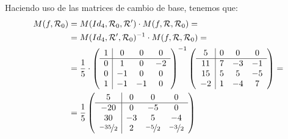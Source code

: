 \documentclass[12pt]{article}
\begin{document}
\begin{ejercicio}[4 puntos]
\begin{enumerate}
            Haciendo uso de las matrices de cambio de base, tenemos que:
            \begin{align*}
                M(f, \mathcal{R}_0) &= M(Id_4, \mathcal{R}_0, \mathcal{R}') \cdot M(f, \mathcal{R}, \mathcal{R}_0) = \\
               &= M(Id_4, \mathcal{R}', \mathcal{R}_0)^{-1} \cdot M(f, \mathcal{R}, \mathcal{R}_0) = \\
                &=  \frac{1}{5}\cdot \left(
                    \begin{array}{c|ccc}
                        1 & 0 & 0 & 0\\ \hline
                        0 & 1 & 0 & -2\\
                        0 & -1 & 0 & 0\\
                        1 & -1 & -1 & 0
                    \end{array}
                \right)^{-1}\left(
                    \begin{array}{c|ccc}
                        5 & 0 & 0 & 0\\ \hline
                        11 & 7 & -3 & -1\\
                        15 & 5 & 5 & -5\\
                        -2 & 1 & -4 & 7
                    \end{array}
                \right) =\\
                &= \frac{1}{5}\left(
                    \begin{array}{c|ccc}
                        5 & 0 & 0 & 0\\ \hline
                        -20 & 0 & -5 & 0 \\
                        30 & -3 & 5 & -4 \\
                        \nicefrac{-35}{2} & 2 & \nicefrac{-5}{2} & \nicefrac{-3}{2}
                    \end{array}
                \right)
            \end{align*}
        \end{enumerate}
    \end{ejercicio}
\end{document}
